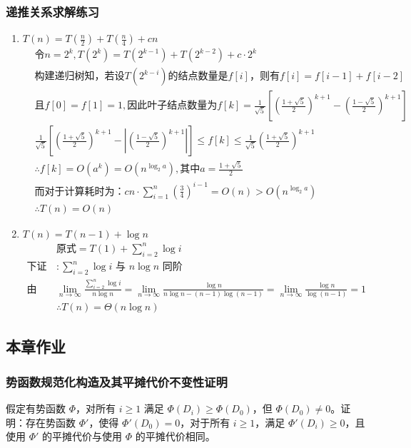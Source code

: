 \documentclass[./../main.tex]{subfiles} %
\begin{document}
\subsubsection{递推关系求解练习}
\begin{enumerate}
    \item $T(n)=T(\frac{n}2)+T(\frac{n}4)+cn$
    \begin{align*}
        &\text{令}n=2^k, T(2^k)=T(2^{k-1})+T(2^{k-2})+c\cdot 2^k\\
        &\text{构建递归树知，若设}T(2^{k-i})\text{的结点数量是}f[i]\text{，则有}f[i]=f[i-1]+f[i-2]\\
        &\text{且}f[0]=f[1]=1, \text{因此叶子结点数量为}f[k]=\frac{1}{\sqrt{5}}\left[\left(\frac{1+\sqrt{5}}{2}\right)^{k+1}-\left(\frac{1-\sqrt{5}}{2}\right)^{k+1}\right]\\
        &\frac{1}{\sqrt{5}}\left[\left(\frac{1+\sqrt{5}}{2}\right)^{k+1}-\left|\left(\frac{1-\sqrt{5}}{2}\right)^{k+1}\right|\right]\leq f[k]\leq\frac{1}{\sqrt{5}}\left(\frac{1+\sqrt{5}}{2}\right)^{k+1}\\
        &\therefore f[k]=O(a^k)=O(n^{\log_2 a}), \text{其中}a=\frac{1+\sqrt{5}}{2}\\
        &\text{而对于计算耗时为：}cn\cdot\sum_{i=1}^n\left(\frac{3}{4}\right)^{i-1}=O(n)>O(n^{\log_2 a})\\
        &\therefore T(n)=O(n)
    \end{align*}
    \item $T(n)=T(n-1)+\log n$
    \begin{align*}
        &\text{原式}=T(1)+\sum_{i=2}^n\log i\\
        \text{下证}&: \text{$\sum_{i=2}^n \log i$ 与 $n \log n$ 同阶} \\
        \text{由Stolz定理知，}& \lim_{n\to\infty} \frac{\sum_{i=2}^n \log i}{n \log n} = \lim_{n\to\infty} \frac{\log n}{n \log n - (n-1)\log(n-1)} = \lim_{n\to\infty} \frac{\log n}{\log(n-1)} = 1 \\
        &\therefore T(n) = \Theta(n \log n)
    \end{align*}
\end{enumerate}

\subsection{本章作业}

\subsubsection{势函数规范化构造及其平摊代价不变性证明}
假定有势函数 $\Phi$，对所有 $i \geq 1$ 满足 $\Phi(D_{i}) \geq \Phi(D_{0})$，但 $\Phi(D_{0}) \neq 0$。证明：存在势函数 $\Phi'$，使得 $\Phi'(D_{0}) = 0$，对于所有 $i \geq 1$，满足 $\Phi'(D_{i}) \geq 0$，且使用 $\Phi'$ 的平摊代价与使用 $\Phi$ 的平摊代价相同。
\end{document}
